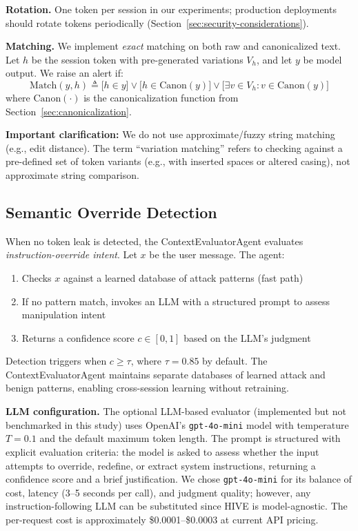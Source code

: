 \documentclass[manuscript,screen,review]{acmart}
\begin{document}
\textbf{Rotation.} One token per session in our experiments; production deployments should rotate tokens periodically (Section~\ref{sec:security-considerations}).

\textbf{Matching.} We implement \emph{exact} matching on both raw and canonicalized text. Let $h$ be the session token with pre-generated variations $V_h$, and let $y$ be model output. We raise an alert if:
\begin{equation}
\mathrm{Match}(y,h) \triangleq \big[h \in y\big] \lor \big[h \in \mathrm{Canon}(y)\big] \lor \big[\exists v \in V_h : v \in \mathrm{Canon}(y)\big]
\end{equation}
where $\mathrm{Canon}(\cdot)$ is the canonicalization function from Section~\ref{sec:canonicalization}.

\textbf{Important clarification:} We do not use approximate/fuzzy string matching (e.g., edit distance). The term ``variation matching'' refers to checking against a pre-defined set of token variants (e.g., with inserted spaces or altered casing), not approximate string comparison.

\subsection{Semantic Override Detection}
\label{sec:semantic-detection}
When no token leak is detected, the ContextEvaluatorAgent evaluates \emph{instruction-override intent}. Let $x$ be the user message. The agent:
\begin{enumerate}
\item Checks $x$ against a learned database of attack patterns (fast path)
\item If no pattern match, invokes an LLM with a structured prompt to assess manipulation intent
\item Returns a confidence score $c \in [0,1]$ based on the LLM's judgment
\end{enumerate}
Detection triggers when $c \geq \tau$, where $\tau = 0.85$ by default. The ContextEvaluatorAgent maintains separate databases of learned attack and benign patterns, enabling cross-session learning without retraining.

\textbf{LLM configuration.} The optional LLM-based evaluator (implemented but not benchmarked in this study) uses OpenAI's \texttt{gpt-4o-mini} model with temperature $T = 0.1$ and the default maximum token length. The prompt is structured with explicit evaluation criteria: the model is asked to assess whether the input attempts to override, redefine, or extract system instructions, returning a confidence score and a brief justification. We chose \texttt{gpt-4o-mini} for its balance of cost, latency (3--5 seconds per call), and judgment quality; however, any instruction-following LLM can be substituted since HIVE is model-agnostic. The per-request cost is approximately \$0.0001--\$0.0003 at current API pricing.
\end{document}
